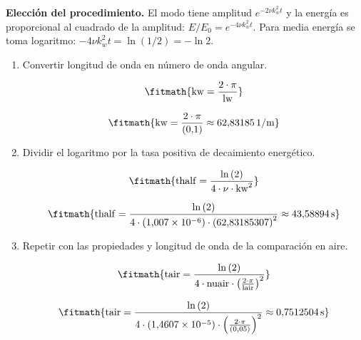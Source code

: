 \noindent\textbf{Elección del procedimiento.} El modo tiene amplitud $e^{-2\nu k_w^2t}$ y la energía es proporcional al cuadrado de la amplitud: $E/E_0=e^{-4\nu k_w^2t}$. Para media energía se toma logaritmo: $-4\nu k_w^2t=\ln(1/2)=-\ln2$.

\begin{enumerate}

\item Convertir longitud de onda en número de onda angular.

\[\fitmath{\mathrm{kw}=\frac{2\cdot \pi}{\mathrm{lw}}}\]

\[\fitmath{\mathrm{kw}=\frac{2\cdot \pi}{(0{,}1)}\approx 62{,}83185\,\mathrm{1/m}}\]

\item Dividir el logaritmo por la tasa positiva de decaimiento energético.

\[\fitmath{\mathrm{thalf}=\frac{\ln\left(2\right)}{4\cdot \nu\cdot {\mathrm{kw}}^{2}}}\]

\[\fitmath{\mathrm{thalf}=\frac{\ln\left(2\right)}{4\cdot (1{,}007\times10^{-6})\cdot {(62{,}83185307)}^{2}}\approx 43{,}58894\,\mathrm{s}}\]

\item Repetir con las propiedades y longitud de onda de la comparación en aire.

\[\fitmath{\mathrm{tair}=\frac{\ln\left(2\right)}{4\cdot \mathrm{nuair}\cdot {\left(\frac{2\cdot \pi}{\mathrm{lair}}\right)}^{2}}}\]

\[\fitmath{\mathrm{tair}=\frac{\ln\left(2\right)}{4\cdot (1{,}4607\times10^{-5})\cdot {\left(\frac{2\cdot \pi}{(0{,}05)}\right)}^{2}}\approx 0{,}7512504\,\mathrm{s}}\]

\end{enumerate}
